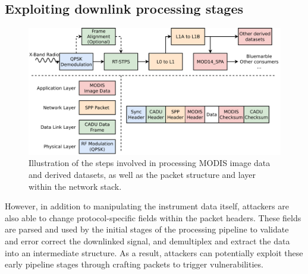 


\subsection{Exploiting downlink processing stages}

\begin{figure}
    \centering
    \includegraphics[width=\linewidth]{diagrams/attack_types.pdf}
    \caption{Illustration of the steps involved in processing MODIS image data and derived datasets, as well as the packet structure and layer within the network stack.}
    \label{fig:attack_types}
\end{figure}



However, in addition to manipulating the instrument data itself, attackers are also able to change protocol-specific fields within the packet headers.
These fields are parsed and used by the initial stages of the processing pipeline to validate and error correct the downlinked signal, and demultiplex and extract the data into an intermediate structure.
As a result, attackers can potentially exploit these early pipeline stages through crafting packets to trigger vulnerabilities.

